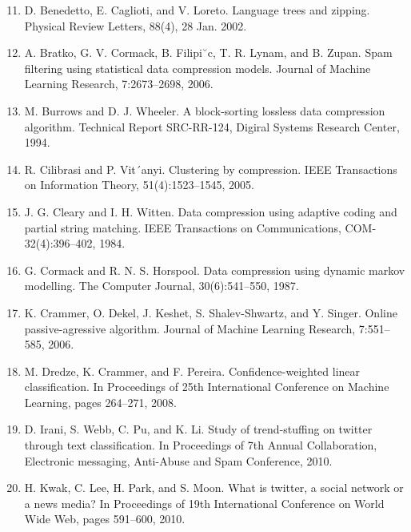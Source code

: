 \documentclass{article}
\begin{document}
\begin{enumerate}
	\setcounter{enumi}{10}
	
	\item D. Benedetto, E. Caglioti, and V. Loreto. Language
	trees and zipping. Physical Review Letters, 88(4), 28
	Jan. 2002.
	
	\item A. Bratko, G. V. Cormack, B. Filipi˘c, T. R. Lynam,
	and B. Zupan. Spam filtering using statistical data
	compression models. Journal of Machine Learning
	Research, 7:2673–2698, 2006.
	
	\item M. Burrows and D. J. Wheeler. A block-sorting
	lossless data compression algorithm. Technical Report
	SRC-RR-124, Digiral Systems Research Center, 1994.
	
	\item R. Cilibrasi and P. Vit´anyi. Clustering by
	compression. IEEE Transactions on Information
	Theory, 51(4):1523–1545, 2005.
	
	\item J. G. Cleary and I. H. Witten. Data compression using
	adaptive coding and partial string matching. IEEE
	Transactions on Communications,
	COM-32(4):396–402, 1984.
	
	\item G. Cormack and R. N. S. Horspool. Data compression
	using dynamic markov modelling. The Computer
	Journal, 30(6):541–550, 1987.
	
	\item K. Crammer, O. Dekel, J. Keshet, S. Shalev-Shwartz,
	and Y. Singer. Online passive-agressive algorithm.
	Journal of Machine Learning Research, 7:551–585,
	2006.

	\item M. Dredze, K. Crammer, and F. Pereira.
	Confidence-weighted linear classification. In
	Proceedings of 25th International Conference on
	Machine Learning, pages 264–271, 2008.

	\item D. Irani, S. Webb, C. Pu, and K. Li. Study of
	trend-stuffing on twitter through text classification. In
	Proceedings of 7th Annual Collaboration, Electronic
	messaging, Anti-Abuse and Spam Conference, 2010.

	\item H. Kwak, C. Lee, H. Park, and S. Moon. What is
	twitter, a social network or a news media? In
	Proceedings of 19th International Conference on
	World Wide Web, pages 591–600, 2010.


\end{enumerate}
\end{document}
